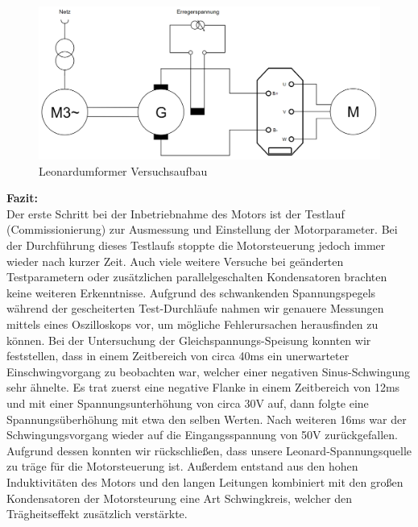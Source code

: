 \begin{figure}[H]
	\begin{center}
		\includegraphics[width=\textwidth]{figures/antrieb/Leonard_Umformer.png}
		\caption{Leonardumformer Versuchsaufbau}
	\end{center}
\end{figure}

\newpage

\textbf{Fazit:}
\\[2mm]
Der erste Schritt bei der Inbetriebnahme des Motors ist der Testlauf (Commissionierung) zur Ausmessung und Einstellung der Motorparameter. Bei der Durchführung dieses Testlaufs stoppte die Motorsteuerung jedoch immer wieder nach kurzer Zeit. Auch viele weitere Versuche bei geänderten Testparametern oder zusätzlichen parallelgeschalten Kondensatoren brachten keine weiteren Erkenntnisse. Aufgrund des schwankenden Spannungspegels während der gescheiterten Test-Durchläufe nahmen wir genauere Messungen mittels eines Oszilloskops vor, um mögliche Fehlerursachen herausfinden zu können. Bei der Untersuchung der Gleichspannungs-Speisung konnten wir feststellen, dass in einem Zeitbereich von circa 40ms ein unerwarteter Einschwingvorgang zu beobachten war, welcher einer negativen Sinus-Schwingung sehr ähnelte. Es trat zuerst eine negative Flanke in einem Zeitbereich von 12ms und mit einer Spannungsunterhöhung von circa 30V auf, dann folgte eine Spannungsüberhöhung mit etwa den selben Werten. Nach weiteren 16ms war der Schwingungsvorgang wieder auf die Eingangsspannung von 50V zurückgefallen. Aufgrund dessen konnten wir rückschließen, dass unsere Leonard-Spannungsquelle zu träge für die Motorsteuerung ist. Außerdem entstand aus den hohen Induktivitäten des Motors und den langen Leitungen kombiniert mit den großen Kondensatoren der Motorsteurung eine Art Schwingkreis, welcher den Trägheitseffekt zusätzlich verstärkte.
\vspace{5mm}

